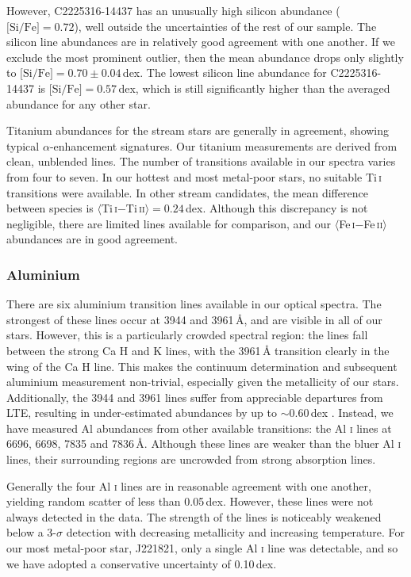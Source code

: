 \documentclass{emulateapj}
\begin{document}
However, C2225316-14437 has an unusually high silicon abundance ($\mbox{[Si/Fe]} = 0.72$), well outside the uncertainties of the rest of our sample. The silicon line abundances are in relatively good agreement with one another. If we exclude the most prominent outlier, then the mean abundance drops only slightly to $\mbox{[Si/Fe]} = 0.70 \pm 0.04$\,dex. The lowest silicon line abundance for C2225316-14437 is $\mbox{[Si/Fe]} = 0.57$\,dex, which is still significantly higher than the averaged abundance for any other star.

Titanium abundances for the stream stars are generally in agreement, showing typical $\alpha$-enhancement signatures. Our titanium measurements are derived from clean, unblended lines. The number of transitions available in our spectra varies from four to seven. In our hottest and most metal-poor stars, no suitable Ti\,\textsc{i} transitions were available. In other stream candidates, the mean difference between species is $\langle$Ti\,\textsc{i}$ - $Ti\,\textsc{ii}$\rangle = 0.24$\,dex. Although this discrepancy is not negligible, there are limited lines available for comparison, and our $\langle$Fe\,\textsc{i}$ - $Fe\,\textsc{ii}$\rangle$ abundances are in good agreement.

\subsubsection{Aluminium}
There are six aluminium transition lines available in our optical spectra. The strongest of these lines occur at 3944 and 3961\,{\AA}, and are visible in all of our stars. However, this is a particularly crowded spectral region: the lines fall between the strong Ca H and K lines, with the 3961\,{\AA} transition clearly in the wing of the Ca H line. This makes the continuum determination and subsequent aluminium measurement non-trivial, especially given the metallicity of our stars. Additionally, the 3944 and 3961 lines suffer from appreciable departures from LTE, resulting in under-estimated abundances by up to $\sim$0.60\,dex \citep{baumuller;gehren_1997}. Instead, we have measured Al abundances from other available transitions: the Al \textsc{i} lines at 6696, 6698, 7835 and 7836\,{\AA}. Although these lines are weaker than the bluer Al \textsc{i} lines, their surrounding regions are uncrowded from strong absorption lines.

Generally the four Al \textsc{i} lines are in reasonable agreement with one another, yielding random scatter of less than 0.05\,dex. However, these lines were not always detected in the data. The strength of the lines is noticeably weakened below a 3-$\sigma$ detection with decreasing metallicity and increasing temperature. For our most metal-poor star, J221821, only a single Al \textsc{i} line was detectable, and so we have adopted a conservative uncertainty of 0.10\,dex. 
\end{document}

